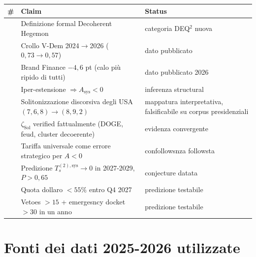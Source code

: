 {\def\LTcaptype{none} %
{\small\begin{longtable}[]{@{}
  >{\raggedright\arraybackslash}p{}
  >{\raggedright\arraybackslash}p{}
  >{\raggedright\arraybackslash}p{}@{}}
\toprule\noalign{}
\begin{minipage}[b]{\linewidth}\raggedright
\#
\end{minipage} & \begin{minipage}[b]{\linewidth}\raggedright
Claim
\end{minipage} & \begin{minipage}[b]{\linewidth}\raggedright
Status
\end{minipage} \\
\midrule\noalign{}
\endhead
\bottomrule\noalign{}
\endlastfoot
1 & Definizione formal Decoherent Hegemon & \Hypoth{} categoria DEQ$^2$
nuova \\
2 & Crollo V-Dem 2024$\to$2026 (\(0{,}73 \to 0{,}57\)) & \Proved{} dato
pubblicato \\
3 & Brand Finance \(-4{,}6\) pt (calo più ripido di tutti) & \Proved{}
dato pubblicato 2026 \\
4 & Iper-estensione \(\Rightarrow A_{\text{sys}} < 0\) & \Hypoth{}
inferenza structural \\
5 & Solitonizzazione discorsiva degli USA \((7,6,8) \to (8,9,2)\) &
\Conj{} mappatura interpretativa, falsificabile su corpus
presidenziali \\
6 & \(\zeta_{\text{Sol}}\) verified fattualmente (DOGE, feud, cluster
decoerente) & \Proved{} evidenza convergente \\
7 & Tariffa universale come errore strategico per \(A < 0\) & \Hypoth{}
confollowsnza followsta \\
8 & Predizione \(T_s^{(2),\text{sys}} \to 0\) in 2027-2029,
\(P > 0{,}65\) & \Conj{} conjecture datata \\
9 & Quota dollaro \(< 55\%\) entro Q4 2027 & \Conj{} predizione
testabile \\
10 & Vetoes \(> 15\) + emergesncy docket \(> 30\) in un anno & \Conj{}
predizione testabile \\
\end{longtable}}
}



\section{Fonti dei dati 2025-2026
utilizzate}\label{fonti-dei-dati-2025-2026-utilizzate}

